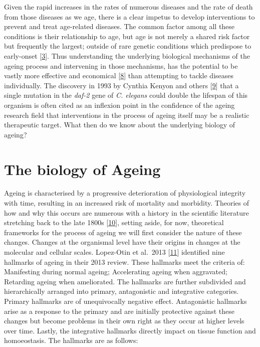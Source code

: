 \documentclass[
]{book}
\begin{document}
Given the rapid increases in the rates of numerous diseases and the rate of death from those diseases as we age, there is a clear impetus to develop interventions to prevent and treat age-related diseases.
The common factor among all these conditions is their relationship to age, but age is not merely a shared risk factor but frequently the largest; outside of rare genetic conditions which predispose to early-onset {[}\protect\hyperlink{ref-Niccoli2012}{3}{]}.
Thus understanding the underlying biological mechanisms of the ageing process and intervening in those mechanisms, has the potential to be vastly more effective and economical {[}\protect\hyperlink{ref-Goldman2016}{8}{]} than attempting to tackle diseases individually.
The discovery in 1993 by Cynthia Kenyon and others {[}\protect\hyperlink{ref-Kenyon1993}{9}{]} that a single mutation in the \emph{daf-2} gene of \emph{C. elegans} could double the lifespan of this organism is often cited as an inflexion point in the confidence of the ageing research field that interventions in the process of ageing itself may be a realistic therapeutic target. What then do we know about the underlying biology of ageing?

\hypertarget{the-biology-of-ageing}{%
\section{The biology of Ageing}\label{the-biology-of-ageing}}

Ageing is characterised by a progressive deterioration of physiological integrity with time, resulting in an increased risk of mortality and morbidity.
Theories of how and why this occurs are numerous with a history in the scientific literature stretching back to the late 1800s {[}\protect\hyperlink{ref-Medvedev1990}{10}{]}, setting aside, for now, theoretical frameworks for the process of ageing we will first consider the nature of these changes.
Changes at the organismal level have their origins in changes at the molecular and cellular scales. Lopez-Otin et al.~2013 {[}\protect\hyperlink{ref-Lopez-Otin2013}{11}{]} identified nine hallmarks of ageing in their 2013 review.
These hallmarks meet the criteria of:
Manifesting during normal ageing;
Accelerating ageing when aggravated;
Retarding ageing when ameliorated.
The hallmarks are further subdivided and hierarchically arranged into primary, antagonistic and integrative categories.
Primary hallmarks are of unequivocally negative effect.
Antagonistic hallmarks arise as a response to the primary and are initially protective against these changes but become problems in their own right as they occur at higher levels over time.
Lastly, the integrative hallmarks directly impact on tissue function and homoeostasis.
The hallmarks are as follows:
\end{document}
